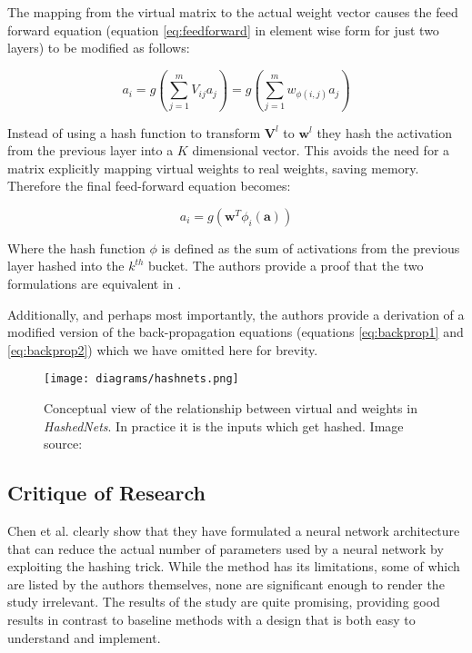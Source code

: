 \documentclass[journal]{IEEEtran}
\begin{document}
 The mapping from the virtual matrix to the actual weight vector causes the feed forward equation (equation \ref{eq:feedforward} in element wise form for just two layers) to be modified as follows:

\begin{equation}
	a_i = g(\sum_{j=1}^m V_{ij}a_j) = g(\sum_{j=1}^m w_{\phi(i,j)}a_j)
\end{equation}

Instead of using a hash function to transform $\bm{V}^l$ to $\bm{w}^l$ they hash the activation from the previous layer into a $K$ dimensional vector. This avoids the need for a matrix explicitly mapping virtual weights to real weights, saving memory. Therefore the final feed-forward equation becomes:

\begin{equation}
	a_i = g(\bm{w}^T \phi_i(\bm{a}))
\end{equation}

Where the hash function $\phi$ is defined as the sum of activations from the previous layer hashed into the $k^{th}$ bucket. The authors provide a proof that the two formulations are equivalent in \cite{chen2015compressing}. 

Additionally, and perhaps most importantly, the authors provide a derivation of a modified version of the back-propagation equations (equations \ref{eq:backprop1} and \ref{eq:backprop2}) which we have omitted here for brevity.

\begin{figure}[h!]
\centering
\texttt{[image: diagrams/hashnets.png]}
\caption{Conceptual view of the relationship between virtual and weights in \textit{HashedNets}. In practice it is the inputs which get hashed. Image source: \cite{chen2015compressing}}
\label{fig:hashednets}
\end{figure}


\subsection{Critique of Research}
Chen et al. clearly show that they have formulated a neural network architecture that can reduce the actual number of parameters used by a neural network by exploiting the hashing trick. While the method has its limitations, some of which are listed by the authors themselves, none are significant enough to render the study irrelevant. The results of the study are quite promising, providing good results in contrast to baseline methods with a design that is both easy to understand and implement.
 
\end{document}
